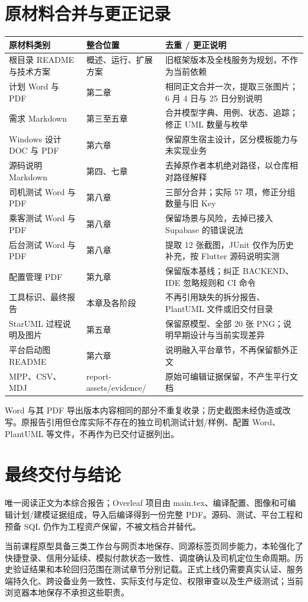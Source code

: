 \documentclass[UTF8,fontset=fandol,zihao=-4,oneside]{ctexrep}
\begin{document}
\section{原材料合并与更正记录}
\begin{longtable}{p{4cm}p{5cm}p{5.7cm}}
\toprule 原材料类别 & 整合位置 & 去重 / 更正说明 \\ \midrule
根目录 README 与技术方案 & 概述、运行、扩展方案 & 旧框架版本及全栈服务为规划，不作为当前依赖 \\
计划 Word 与 PDF & 第二章 & 相同正文合并一次，提取三张图片；6 月 4 日与 25 日分别说明 \\
需求 Markdown & 第三至五章 & 合并模型字典、用例、状态、追踪；修正 UML 数量与枚举 \\
Windows 设计 DOC 与 PDF & 第六章 & 保留原生宿主设计，区分模板能力与未实现业务 \\
源码说明 Markdown & 第四、七章 & 去掉原作者本机绝对路径，以仓库相对路径解释 \\
司机测试 Word 与 PDF & 第八章 & 三部分合并；实际 57 项，修正分组数量与旧 Key \\
乘客测试 Word 与 PDF & 第八章 & 保留场景与风险，去掉已接入 Supabase 的错误说法 \\
后台测试 Word 与 PDF & 第八章 & 提取 12 张截图，JUnit 仅作为历史补充，按 Flutter 源码说明实测 \\
配置管理 PDF & 第九章 & 保留版本基线；纠正 BACKEND、IDE 忽略规则和 CI 命令 \\
工具标识、最终报告 & 本章及各阶段 & 不再引用缺失的拆分报告、PlantUML 文件或旧交付目录 \\
StarUML 过程说明及图片 & 第五章 & 保留原模型、全部 20 张 PNG；说明早期设计与当前实现差异 \\
平台启动图 README & 第六章 & 说明融入平台章节，不再保留额外正文 \\
MPP、CSV、MDJ & report-assets/evidence/ & 原始可编辑证据保留，不产生平行文档 \\
\bottomrule
\end{longtable}
Word 与其 PDF 导出版本内容相同的部分不重复收录；历史截图未经伪造或改写。原报告引用但仓库实际不存在的独立司机测试计划/样例、配置 Word、PlantUML 等文件，不再作为已交付证据列出。

\section{最终交付与结论}
唯一阅读正文为本综合报告；Overleaf 项目由 main.tex、编译配置、图像和可编辑计划/建模证据组成，导入后编译得到一份完整 PDF。源码、测试、平台工程和预备 SQL 仍作为工程资产保留，不被文档合并替代。

当前课程原型具备三类工作台与网页本地保存、同源标签页同步能力，本轮强化了快捷登录、信用分延续、模拟付款状态一致性、调度确认及司机定位生命周期。历史验证结果和本轮回归范围在测试章节分别记载。正式上线仍需要真实认证、服务端持久化、跨设备业务一致性、实际支付与定位、权限审查以及生产级测试；当前浏览器本地保存不承担这些职责。
\end{document}
